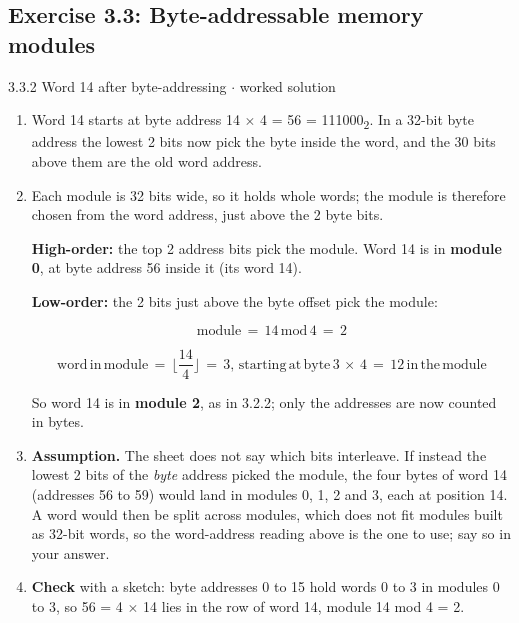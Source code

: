 \documentclass[11pt]{article}
\begin{document}
\begin{keepsection}\subsection{Exercise 3.3: Byte-addressable memory modules}

\begin{workedbox}{3.3.2 Word 14 after byte-addressing \ensuremath{\cdot} worked solution}
\begin{enumerate}
\item Word 14 starts at byte address 14 \ensuremath{\times} 4 = 56 = 111000\textsubscript{2}. In a 32-bit byte address the lowest 2 bits now pick the byte inside the word, and the 30 bits above them are the old word address.
\item {}
Each module is 32 bits wide, so it holds whole words; the module is therefore chosen from the word address, just above the 2 byte bits.

\textbf{High-order:} the top 2 address bits pick the module. Word 14 is in \textbf{module 0}, at byte address 56 inside it (its word 14).

\textbf{Low-order:} the 2 bits just above the byte offset pick the module:

\begin{equation*}\text{module}\, =\, 14\, \text{mod}\, 4\, =\, 2\end{equation*}

\begin{equation*}\text{word}\, \text{in}\, \text{module}\, =\, ⌊\dfrac{14}{4}⌋\, =\, 3,\, \text{starting}\, \text{at}\, \text{byte}\, 3\, \times \, 4\, =\, 12\, \text{in}\, \text{the}\, \text{module}\end{equation*}

So word 14 is in \textbf{module 2}, as in 3.2.2; only the addresses are now counted in bytes.
\item \textbf{Assumption.} The sheet does not say which bits interleave. If instead the lowest 2 bits of the \emph{byte} address picked the module, the four bytes of word 14 (addresses 56 to 59) would land in modules 0, 1, 2 and 3, each at position 14. A word would then be split across modules, which does not fit modules built as 32-bit words, so the word-address reading above is the one to use; say so in your answer.
\item \textbf{Check} with a sketch: byte addresses 0 to 15 hold words 0 to 3 in modules 0 to 3, so 56 = 4 \ensuremath{\times} 14 lies in the row of word 14, module 14 mod 4 = 2.
\end{enumerate}
\end{workedbox}

\end{keepsection}
\end{document}
